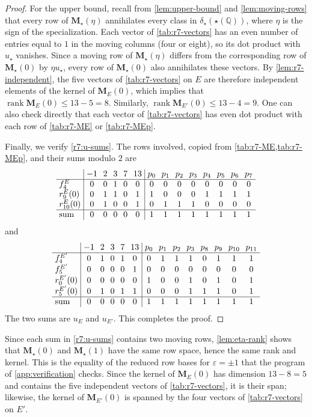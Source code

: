 \documentclass[12pt,oneside,openany]{book}
\theoremstyle{definition}
\theoremstyle{plain}
\numberwithin{equation}{chapter}
\theoremstyle{plain}
\theoremstyle{definition}
\theoremstyle{remark}
\newcommand{\Q}{\mathbb Q}
\DeclareMathOperator{\rk}{rank}
\newcommand{\eps}{\varepsilon}
\begin{document}
\begin{proof}
For the upper bound, recall from \cref{lem:upper-bound} and
\cref{lem:moving-rows} that every row of $\mathbf M_\star(\eta)$ annihilates
every class in $\delta_\star(\star(\Q))$, where $\eta$ is the sign of the
specialization. Each vector of \cref{tab:r7-vectors} has an even number of
entries equal to $1$ in the moving columns (four or eight), so its dot product
with $u_\star$ vanishes. Since a moving row of $\mathbf M_\star(\eta)$ differs
from the corresponding row of $\mathbf M_\star(0)$ by $\eta u_\star$, every row
of $\mathbf M_\star(0)$ also annihilates these vectors. By
\cref{lem:r7-independent}, the five vectors of \cref{tab:r7-vectors} on $E$
are therefore independent elements of the kernel of $\mathbf M_E(0)$, which
implies that
$\rk\mathbf M_E(0)\le13-5=8$. Similarly, $\rk\mathbf M_{E'}(0)\le13-4=9$. One can also check directly that each
vector of \cref{tab:r7-vectors} has even dot product with each row of
\cref{tab:r7-ME} or \cref{tab:r7-MEp}.

Finally, we verify \eqref{r7:u-sums}. The rows involved, copied from
\cref{tab:r7-ME,tab:r7-MEp}, and their sums modulo $2$ are
\[
\setlength{\arraycolsep}{3.5pt}
\begin{array}{l|ccccc|cccccccc}
 & -1 & 2 & 3 & 7 & 13 & p_0 & p_1 & p_2 & p_3 & p_4 & p_5 & p_6 & p_7\\\hline
 f^E_4 & 0&0&1&0&0 & 0&0&0&0&0&0&0&0\\
 r^{E}_9(0) & 0&1&1&0&1 & 1&0&0&0&1&1&1&1\\
 r^{E}_{10}(0) & 0&1&0&0&1 & 0&1&1&1&0&0&0&0\\\hline
 \text{sum} & 0&0&0&0&0 & 1&1&1&1&1&1&1&1
\end{array}
\]
and
\[
\setlength{\arraycolsep}{3.5pt}
\begin{array}{l|ccccc|cccccccc}
 & -1 & 2 & 3 & 7 & 13 & p_0 & p_1 & p_2 & p_3 & p_8 & p_9 & p_{10} & p_{11}\\\hline
 f^{E'}_4 & 0&1&0&1&0 & 0&1&1&1&0&1&1&1\\
 f^{E'}_5 & 0&0&0&0&1 & 0&0&0&0&0&0&0&0\\
 r^{E'}_0(0) & 0&0&0&0&0 & 1&0&0&1&0&1&0&1\\
 r^{E'}_5(0) & 0&1&0&1&1 & 0&0&0&1&1&1&0&1\\\hline
 \text{sum} & 0&0&0&0&0 & 1&1&1&1&1&1&1&1
\end{array}
\]
The two sums are $u_E$ and $u_{E'}$. This completes the proof.
\end{proof}

Since each sum in \eqref{r7:u-sums} contains two moving rows,
\cref{lem:eta-rank} shows that $\mathbf M_\star(0)$ and $\mathbf M_\star(1)$
have the same row space, hence the same rank and kernel. This is the
equality of the reduced row bases for $\eps=\pm1$ that the program of
\cref{app:verification} checks. Since the kernel of $\mathbf M_E(0)$
has dimension $13-8=5$ and contains the five independent vectors of
\cref{tab:r7-vectors}, it is their span; likewise, the kernel of
$\mathbf M_{E'}(0)$ is spanned by the four vectors of \cref{tab:r7-vectors}
on $E'$.
\end{document}
